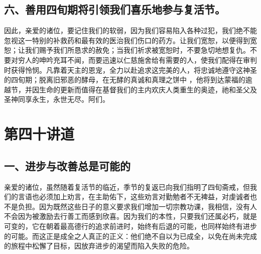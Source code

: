 
\subsection{六、善用四旬期将引领我们喜乐地参与复活节。}

因此，亲爱的诸位，要记住我们的软弱，因为我们容易陷入各种过犯，我们绝不能忽视这一特别的补救药和最有效的医治我们伤口的药方。让我们宽恕，以便得到宽恕；让我们赐予我们所恳求的赦免；当我们祈求被宽恕时，不要急切地想复仇。不要对穷人的呻吟充耳不闻，而要迅速以仁慈施舍给有需要的人，使我们配得在审判时获得怜悯。凡靠着天主的恩宠，全力以赴追求这完美的人，将忠诚地遵守这神圣的四旬期；脱离旧邪恶的酵母，在无酵的真诚和真理之饼中 ，他将到达蒙福的逾越节，并因生命的更新而值得在基督我们的主内欢庆人类重生的奥迹，祂和圣父及圣神同享永生，永世无尽。阿们。\par



\section{第四十讲道}

\par


\subsection{一、进步与改善总是可能的}

亲爱的诸位，虽然随着复活节的临近，季节的复返已向我们指明了四旬斋戒，但我们的言语也必须加上劝言，在主助佑下，这些劝言对勤勉者不无裨益，对虔诚者也不是负担。因为既然这些日子的意义要求我们增加一切宗教功课，我相信，没有人不会因为被激励去行善工而感到欣喜。因为我们的本性，只要我们还属必朽，就是可变的，它在朝着最高德行的追求前进时，始终有后退的可能，也同样始终有进步的可能。而这正是成全之人真正的正义：他们绝不自以为已成全，以免在尚未完成的旅程中松懈了目标，因放弃进步的渴望而陷入失败的危险。\par

